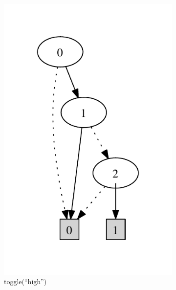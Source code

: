 \begin{figure}
\begin{subfigure}[b]{0.25\textwidth}
        \includegraphics[width=\textwidth]{figures/bdd2.pdf}
        \caption{toggle(``high'')}
        \label{fig:bdd2}
    \end{subfigure}
    ~ 
    \begin{subfigure}[b]{0.25\textwidth}

\end{subfigure}
\end{figure}
